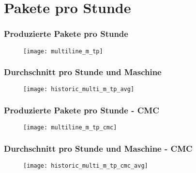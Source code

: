 \section{Pakete pro Stunde}

\begin{frame}
    \frametitle{Produzierte Pakete pro Stunde}

    \begin{figure}
        \centering
        \texttt{[image: multiline\_m\_tp]}
    \end{figure}

\end{frame}

\begin{frame}
    \frametitle{Durchschnitt pro Stunde und Maschine}

    \begin{figure}
        \centering
        \texttt{[image: historic\_multi\_m\_tp\_avg]}
    \end{figure}

\end{frame}

\begin{frame}
    \frametitle{Produzierte Pakete pro Stunde - CMC}

    \begin{figure}
        \centering
        \texttt{[image: multiline\_m\_tp\_cmc]}
    \end{figure}

\end{frame}

\begin{frame}
    \frametitle{Durchschnitt pro Stunde und Maschine - CMC}

    \begin{figure}
        \centering
        \texttt{[image: historic\_multi\_m\_tp\_cmc\_avg]}
    \end{figure}

\end{frame}